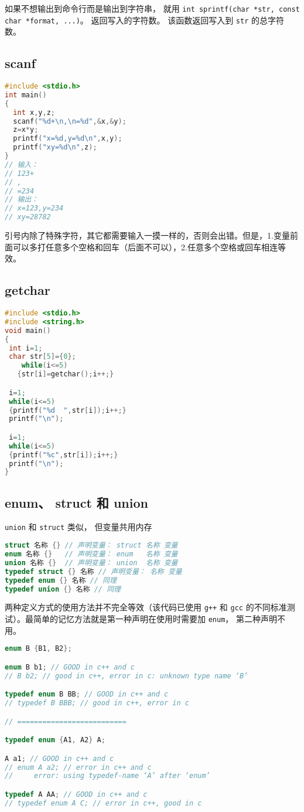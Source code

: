 如果不想输出到命令行而是输出到字符串， 就用 \verb|int sprintf(char *str, const char *format, ...)|。 返回写入的字符数。 该函数返回写入到 \verb|str| 的总字符数。

\subsection{scanf}
\begin{lstlisting}[language=cpp]
#include <stdio.h>
int main()
{
  int x,y,z;
  scanf("%d+\n,\n=%d",&x,&y);
  z=x*y;
  printf("x=%d,y=%d\n",x,y);
  printf("xy=%d\n",z);
}
// 输入：
// 123+
// ,
// =234
// 输出：
// x=123,y=234
// xy=28782
\end{lstlisting}
引号内除了特殊字符，其它都需要输入一摸一样的，否则会出错。但是，1.变量前面可以多打任意多个空格和回车（后面不可以），2.任意多个空格或回车相连等效。

\subsection{getchar}
\begin{lstlisting}[language=cpp]
#include <stdio.h>
#include <string.h>
void main()
{
 int i=1;
 char str[5]={0};
    while(i<=5)
   {str[i]=getchar();i++;}

 i=1;
 while(i<=5)
 {printf("%d  ",str[i]);i++;}
 printf("\n");

 i=1;
 while(i<=5)
 {printf("%c",str[i]);i++;}
 printf("\n");
}
\end{lstlisting}

\subsection{enum、 struct 和 union}
\verb`union` 和 \verb`struct` 类似， 但变量共用内存
\begin{lstlisting}[language=cpp]
struct 名称 {} // 声明变量： struct 名称 变量
enum 名称 {}   // 声明变量： enum   名称 变量
union 名称 {}  // 声明变量： union  名称 变量
typedef struct {} 名称 // 声明变量： 名称 变量
typedef enum {} 名称 // 同理
typedef union {} 名称 // 同理
\end{lstlisting}

两种定义方式的使用方法并不完全等效（该代码已使用 \verb`g++` 和 \verb`gcc` 的不同标准测试）。最简单的记忆方法就是第一种声明在使用时需要加 \verb`enum`， 第二种声明不用。
\begin{lstlisting}[language=cpp]
enum B {B1, B2};

enum B b1; // GOOD in c++ and c
// B b2; // good in c++, error in c: unknown type name ‘B’

typedef enum B BB; // GOOD in c++ and c
// typedef B BBB; // good in c++, error in c

// ==========================

typedef enum {A1, A2} A;

A a1; // GOOD in c++ and c
// enum A a2; // error in c++ and c
//     error: using typedef-name ‘A’ after ‘enum’

typedef A AA; // GOOD in c++ and c
// typedef enum A C; // error in c++, good in c
\end{lstlisting}

